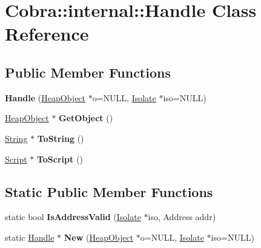 \hypertarget{class_cobra_1_1internal_1_1_handle}{\section{Cobra\+:\+:internal\+:\+:Handle Class Reference}
\label{class_cobra_1_1internal_1_1_handle}
}
\subsection*{Public Member Functions}
\begin{DoxyCompactItemize}
\item 
\hypertarget{class_cobra_1_1internal_1_1_handle_a0d9840ec9a102d4e600257ee4cfd1269}{{\bfseries Handle} (\hyperlink{struct_cobra_1_1internal_1_1_heap_object}{Heap\+Object} $\ast$o=N\+U\+L\+L, \hyperlink{class_cobra_1_1internal_1_1_isolate}{Isolate} $\ast$iso=N\+U\+L\+L)}\label{class_cobra_1_1internal_1_1_handle_a0d9840ec9a102d4e600257ee4cfd1269}

\item 
\hypertarget{class_cobra_1_1internal_1_1_handle_a73e7eec02b0364ff8b93d058262858f9}{\hyperlink{struct_cobra_1_1internal_1_1_heap_object}{Heap\+Object} $\ast$ {\bfseries Get\+Object} ()}\label{class_cobra_1_1internal_1_1_handle_a73e7eec02b0364ff8b93d058262858f9}

\item 
\hypertarget{class_cobra_1_1internal_1_1_handle_ab41a1526137640b18e2c6f2da297a80a}{\hyperlink{class_cobra_1_1internal_1_1_string}{String} $\ast$ {\bfseries To\+String} ()}\label{class_cobra_1_1internal_1_1_handle_ab41a1526137640b18e2c6f2da297a80a}

\item 
\hypertarget{class_cobra_1_1internal_1_1_handle_a8373f2edb1922a2da2c5b62ae6f700af}{\hyperlink{class_cobra_1_1internal_1_1_script}{Script} $\ast$ {\bfseries To\+Script} ()}\label{class_cobra_1_1internal_1_1_handle_a8373f2edb1922a2da2c5b62ae6f700af}

\end{DoxyCompactItemize}
\subsection*{Static Public Member Functions}
\begin{DoxyCompactItemize}
\item 
\hypertarget{class_cobra_1_1internal_1_1_handle_a443c0ea101538de9670b8610f51dd5e5}{static bool {\bfseries Is\+Address\+Valid} (\hyperlink{class_cobra_1_1internal_1_1_isolate}{Isolate} $\ast$iso, Address addr)}\label{class_cobra_1_1internal_1_1_handle_a443c0ea101538de9670b8610f51dd5e5}

\item 
\hypertarget{class_cobra_1_1internal_1_1_handle_a5ff8948c170fe906766690b7e5cb3388}{static \hyperlink{class_cobra_1_1internal_1_1_handle}{Handle} $\ast$ {\bfseries New} (\hyperlink{struct_cobra_1_1internal_1_1_heap_object}{Heap\+Object} $\ast$o=N\+U\+L\+L, \hyperlink{class_cobra_1_1internal_1_1_isolate}{Isolate} $\ast$iso=N\+U\+L\+L)}\label{class_cobra_1_1internal_1_1_handle_a5ff8948c170fe906766690b7e5cb3388}

\end{DoxyCompactItemize}
